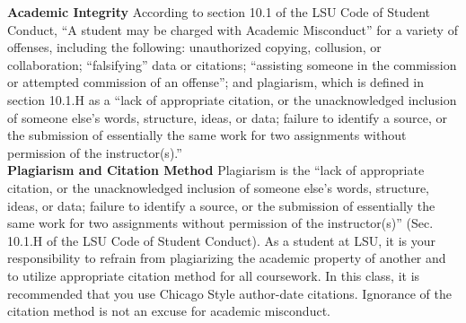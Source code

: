 \documentclass[11pt,article,oneside]{memoir}
\begin{document}
\noindent \textbf{Academic Integrity}
According to section 10.1 of the LSU Code of Student Conduct, ``A student may be charged with Academic Misconduct'' for a variety of offenses, including the following: unauthorized copying, collusion, or collaboration; ``falsifying'' data or citations; ``assisting someone in the commission or attempted commission of an offense''; and plagiarism, which is defined in section 10.1.H as a ``lack of appropriate citation, or the unacknowledged inclusion of someone else's words, structure, ideas, or data; failure to identify a source, or the submission of essentially the same work for two assignments without permission of the instructor(s).''\\

\noindent \textbf{Plagiarism and Citation Method}
Plagiarism is the ``lack of appropriate citation, or the unacknowledged inclusion of someone else's words, structure, ideas, or data; failure to identify a source, or the submission of essentially the same work for two assignments without permission of the instructor(s)'' (Sec. 10.1.H of the LSU Code of Student Conduct). As a student at LSU, it is your responsibility to refrain from plagiarizing the academic property of another and to utilize appropriate citation method for all coursework. In this class, it is recommended that you use Chicago Style author-date citations. Ignorance of the citation method is not an excuse for academic misconduct.\\
\end{document}
